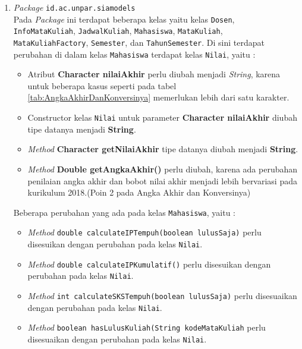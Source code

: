 \documentclass[a4paper,twoside]{article}
\begin{document}
\begin{enumerate}
\begin{enumerate}
\begin{enumerate}
				\item \textit{Package} \texttt{id.ac.unpar.siamodels}\\
				Pada \textit{Package} ini terdapat beberapa kelas yaitu kelas \texttt{Dosen}, \texttt{InfoMataKuliah}, \texttt{JadwalKuliah}, \texttt{Mahasiswa}, \texttt{MataKuliah}, \texttt{MataKuliahFactory}, \texttt{Semester}, dan \texttt{TahunSemester}. Di sini terdapat perubahan di dalam kelas \texttt{Mahasiswa} terdapat kelas \texttt{Nilai}, yaitu :
				\begin{itemize}
					\item Atribut \textbf{Character nilaiAkhir} perlu diubah menjadi \textit{String}, karena untuk beberapa kasus seperti pada tabel \ref{tab:AngkaAkhirDanKonversinya} memerlukan lebih dari satu karakter.
					\item Constructor kelas \texttt{Nilai} untuk parameter \textbf{Character nilaiAkhir} diubah tipe datanya menjadi \textbf{String}.
					\item \textit{Method} \textbf{Character getNilaiAkhir} tipe datanya diubah menjadi \textbf{String}.
					\item \textit{Method} \textbf{Double getAngkaAkhir()} perlu diubah, karena ada perubahan penilaian angka akhir dan bobot nilai akhir menjadi lebih bervariasi pada kurikulum 2018.(Poin 2 pada Angka Akhir dan Konversinya) 
				\end{itemize}
				Beberapa perubahan yang ada pada kelas \texttt{Mahasiswa}, yaitu :
				\begin{itemize}
					\item \textit{Method} \texttt{double calculateIPTempuh(boolean lulusSaja)} perlu disesuikan dengan perubahan pada kelas \texttt{Nilai}.
					\item \textit{Method} \texttt{double calculateIPKumulatif()} perlu disesuikan dengan perubahan pada kelas \texttt{Nilai}.
					\item \textit{Method} \texttt{int calculateSKSTempuh(boolean lulusSaja)} perlu disesuaikan dengan perubahan pada kelas \texttt{Nilai}.
					\item \textit{Method} \texttt{boolean hasLulusKuliah(String kodeMataKuliah} perlu disesuaikan dengan perubahan pada kelas \texttt{Nilai}.
				\end{itemize}
			\end{enumerate}


\end{enumerate}
\end{enumerate}
\end{document}

